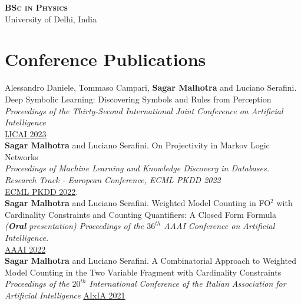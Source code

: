 \documentclass[10pt, a4paper]{article}
\newcommand{\years}[1]{\marginnote{\scriptsize #1}}
\begin{document}
\years{2012-2015}\textsc{\textbf{BSc in Physics}}\\
University of Delhi, India




\section*{Conference Publications}

\noindent
\years{2023}Alessandro Daniele, Tommaso Campari, \textbf{Sagar Malhotra} and Luciano Serafini. \\ Deep Symbolic Learning: Discovering Symbols and Rules from Perception \\ 
\emph{Proceedings of the Thirty-Second International Joint Conference on Artificial Intelligence}\\
\href{https://www.ijcai.org/proceedings/2023/400}{IJCAI 2023}\\ 

\years{2022}\textbf{Sagar Malhotra} and Luciano Serafini. On Projectivity in Markov Logic Networks \\ \emph{Proceedings of Machine Learning and Knowledge Discovery in Databases. Research Track - European Conference, ECML PKDD 2022} \\  
\href{https://link.springer.com/chapter/10.1007/978-3-031-26419-1_14}{ECML PKDD 2022}.\\ 

\years{2022}\textbf{Sagar Malhotra} and Luciano Serafini. Weighted Model Counting in FO$^2$ with Cardinality Constraints and Counting Quantifiers: A Closed Form Formula \\ \emph{(\textbf{Oral} presentation) Proceedings of the $36^{th}$ AAAI Conference on Artificial Intelligence.}\\
\href{https://ojs.aaai.org/index.php/AAAI/article/view/20525}{AAAI 2022} \\

\years{2021}\textbf{Sagar Malhotra} and Luciano Serafini. A Combinatorial Approach to Weighted Model Counting in the Two Variable Fragment with Cardinality Constraints\\ \emph{ Proceedings of the $20^{th}$ International Conference of the Italian Association for Artificial Intelligence}
\href{https://link.springer.com/chapter/10.1007/978-3-031-08421-8_10}{AIxIA 2021}
\end{document}
